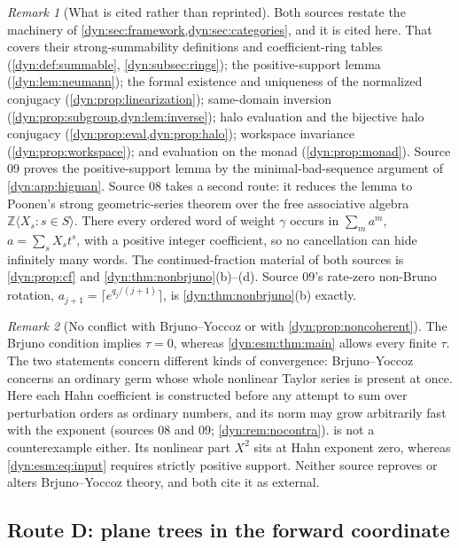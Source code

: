 \documentclass[11pt,letterpaper]{article}
\theoremstyle{definition}
\theoremstyle{remark}
\newtheorem{remark}[remark]{Remark}
\newcommand{\Z}{\mathbb Z}
\numberwithin{equation}{section}
\begin{document}
\begin{remark}[What is cited rather than reprinted]
\label{dyn:esm:rem:duplicates}
Both sources restate the machinery of
\cref{dyn:sec:framework,dyn:sec:categories}, and it is cited here. That
covers their strong-summability definitions and coefficient-ring tables
(\cref{dyn:def:summable}, \cref{dyn:subsec:rings}); the positive-support
lemma (\cref{dyn:lem:neumann}); the formal existence and uniqueness of the
normalized conjugacy (\cref{dyn:prop:linearization}); same-domain inversion
(\cref{dyn:prop:subgroup,dyn:lem:inverse}); halo evaluation and the bijective
halo conjugacy (\cref{dyn:prop:eval,dyn:prop:halo}); workspace invariance
(\cref{dyn:prop:workspace}); and evaluation on the monad
(\cref{dyn:prop:monad}). Source 09 proves the positive-support lemma by the
minimal-bad-sequence argument of \cref{dyn:app:higman}. Source 08 takes a
second route: it reduces the lemma to Poonen's strong geometric-series
theorem \cite[Thm.~4.1]{Poonen} over the free associative algebra
$\Z\langle X_s:s\in S\rangle$. There every ordered word of weight $\gamma$
occurs in $\sum_ma^{m}$, $a=\sum_sX_st^{s}$, with a positive integer
coefficient, so no cancellation can hide infinitely many words. The
continued-fraction material of both sources is \cref{dyn:prop:cf} and
\cref{dyn:thm:nonbrjuno}(b)--(d). Source 09's rate-zero non-Bruno rotation,
$a_{j+1}=\lceil e^{q_j/(j+1)}\rceil$, is \cref{dyn:thm:nonbrjuno}(b) exactly.
\end{remark}

\begin{remark}[No conflict with Brjuno--Yoccoz or with
\cref{dyn:prop:noncoherent}]\label{dyn:esm:rem:nocontra}
The Brjuno condition implies $\tau=0$, whereas \cref{dyn:esm:thm:main}
allows every finite $\tau$. The two statements concern different kinds of
convergence: Brjuno--Yoccoz concerns an ordinary germ whose whole nonlinear
Taylor series is present at once. Here each Hahn coefficient is
constructed before any attempt to sum over perturbation orders as ordinary
numbers, and its norm may grow arbitrarily fast with the exponent (sources
08 and 09; \cref{dyn:rem:nocontra}).  is not a
counterexample either. Its nonlinear part $X^{2}$ sits at Hahn exponent
zero, whereas \eqref{dyn:esm:eq:input} requires strictly positive support.
Neither source reproves or alters Brjuno--Yoccoz theory, and both cite it
as external.
\end{remark}

\subsection{Route D: plane trees in the forward coordinate}
\label{dyn:tree:subsec}
\end{document}
